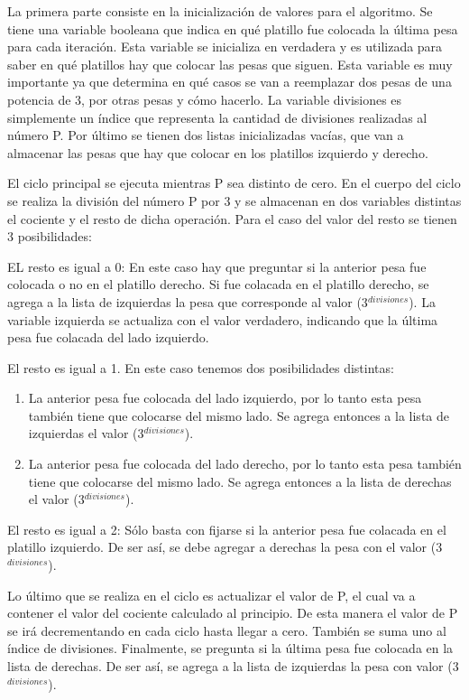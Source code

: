 	\begin{enumerate}
		\item{
			La primera parte consiste en la inicialización de valores para el algoritmo. Se tiene una variable booleana que indica en qué platillo fue colocada la última pesa para cada iteración. Esta variable se inicializa en verdadera y es utilizada para saber en qué platillos hay que colocar las pesas que siguen. Esta variable es muy importante ya que determina en qué casos se van a reemplazar dos pesas de una potencia de 3, por otras pesas y cómo hacerlo. La variable divisiones es simplemente un índice que representa la cantidad de divisiones realizadas al número P. Por último se tienen dos listas inicializadas vacías, que van a almacenar las pesas que hay que colocar en los platillos izquierdo y derecho.
		}

		\item{
			El ciclo principal se ejecuta mientras P sea distinto de cero. En el cuerpo del ciclo se realiza la división del número P por 3 y se almacenan en dos variables distintas el cociente y el resto de dicha operación. Para el caso del valor del resto se tienen 3 posibilidades:
			\begin{enumerate}
				\item{
					EL resto es igual a 0: En este caso hay que preguntar si la anterior pesa fue colocada o no en el platillo derecho. Si fue colacada en el platillo derecho, se agrega a la lista de izquierdas la pesa que corresponde al valor (3$^{divisiones}$). La variable izquierda se actualiza con el valor verdadero, indicando que la última pesa fue colacada del lado izquierdo.
				}
				\item{
					El resto es igual a 1. En este caso tenemos dos posibilidades distintas:
					\begin{enumerate}
						\item{
							La anterior pesa fue colocada del lado izquierdo, por lo tanto esta pesa también tiene que colocarse del mismo lado. Se agrega entonces a la lista de izquierdas el valor (3$^{divisiones}$).
						}
						\item{
							La anterior pesa fue colocada del lado derecho, por lo tanto esta pesa también tiene que colocarse del mismo lado. Se agrega entonces a la lista de derechas el valor (3$^{divisiones}$).
						}
					\end{enumerate}
				\item{
					El resto es igual a 2: Sólo basta con fijarse si la anterior pesa fue colacada en el platillo izquierdo. De ser así, se debe agregar a derechas la pesa con el valor (3$^{divisiones}$).
				}
				}
				\end{enumerate}
			}
			\item{
			    Lo último que se realiza en el ciclo es actualizar el valor de P, el cual va a contener el valor del cociente calculado al principio. De esta manera el valor de P se irá decrementando en cada ciclo hasta llegar a cero. También se suma uno al índice de divisiones.
				Finalmente, se pregunta si la última pesa fue colocada en la lista de derechas. De ser así, se agrega a la lista de izquierdas la pesa con valor (3$^{divisiones}$).
			}
	\end{enumerate}


